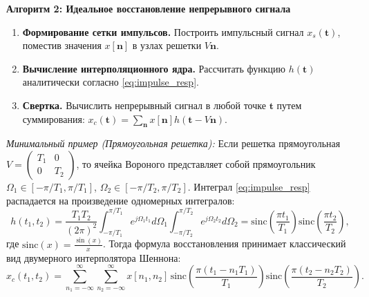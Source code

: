 \documentclass[12pt, a4paper]{article}
\begin{document}
\vspace{0.5cm}
\noindent\textbf{Алгоритм 2: Идеальное восстановление непрерывного сигнала}
\begin{enumerate}
    \item \textbf{Формирование сетки импульсов.} Построить импульсный сигнал $x_s(\mathbf{t})$, поместив значения $x[\mathbf{n}]$ в узлах решетки $V\mathbf{n}$.
    \item \textbf{Вычисление интерполяционного ядра.} Рассчитать функцию $h(\mathbf{t})$ аналитически согласно \eqref{eq:impulse_resp}.
    \item \textbf{Свертка.} Вычислить непрерывный сигнал в любой точке $\mathbf{t}$ путем суммирования: $x_c(\mathbf{t}) = \sum_{\mathbf{n}} x[\mathbf{n}] h(\mathbf{t} - V\mathbf{n})$.
\end{enumerate}

\textit{Минимальный пример (Прямоугольная решетка):}
Если решетка прямоугольная $V = \begin{pmatrix} T_1 & 0 \\ 0 & T_2 \end{pmatrix}$, то ячейка Вороного представляет собой прямоугольник $\Omega_1 \in [-\pi/T_1, \pi/T_1]$, $\Omega_2 \in [-\pi/T_2, \pi/T_2]$.
Интеграл \eqref{eq:impulse_resp} распадается на произведение одномерных интегралов:
\begin{equation}
    h(t_1, t_2) = \frac{T_1 T_2}{(2\pi)^2} \int_{-\pi/T_1}^{\pi/T_1} e^{j \Omega_1 t_1} d\Omega_1 \int_{-\pi/T_2}^{\pi/T_2} e^{j \Omega_2 t_2} d\Omega_2 = \text{sinc}\left(\frac{\pi t_1}{T_1}\right) \text{sinc}\left(\frac{\pi t_2}{T_2}\right),
\end{equation}
где $\text{sinc}(x) = \frac{\sin(x)}{x}$.
Тогда формула восстановления принимает классический вид двумерного интерполятора Шеннона:
\begin{equation}
    x_c(t_1, t_2) = \sum_{n_1=-\infty}^{\infty} \sum_{n_2=-\infty}^{\infty} x[n_1, n_2] \, \text{sinc}\left(\frac{\pi (t_1 - n_1 T_1)}{T_1}\right) \text{sinc}\left(\frac{\pi (t_2 - n_2 T_2)}{T_2}\right).
\end{equation}
\end{document}
